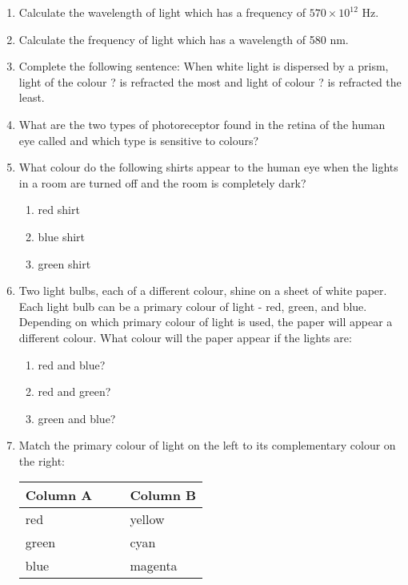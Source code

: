 \begin{eocexercises}{}
\begin{enumerate}

\item{Calculate the wavelength of light which has a frequency of $570 \times 10^{12}$ Hz.}

\item{Calculate the frequency of light which has a wavelength of 580 nm.}

\item{Complete the following sentence: When white light is dispersed by a prism, light of the colour ? is refracted the most and light of colour ? is refracted the least.}

\item{What are the two types of photoreceptor found in the retina of the human eye called and which type is sensitive to colours?}

\item{What colour do the following shirts appear to the human eye when the lights in a room are turned off and the room is completely dark?
\begin{enumerate}
\item{red shirt}
\item{blue shirt}
\item{green shirt}
\end{enumerate}}
\item{Two light bulbs, each of a different colour, shine on a sheet of white paper. Each light bulb can be a primary colour of light - red, green, and blue. Depending on which primary colour of light is used, the paper will appear a different colour. What colour will the paper appear if the lights are:
\begin{enumerate}
\item{red and blue?}
\item{red and green?}
\item{green and blue?}
\end{enumerate}}

\item{
Match the primary colour of light on the left to its complementary colour on the right:
\begin{center}
\begin{tabular}{ll}
\textbf{Column A} & \textbf{Column B} \\ \hline
red   \ \ \ & yellow \\
green \ \ \ \ \ \ \ \ \ & cyan \\
blue  \ \ \ & magenta \\
\end{tabular}
\end{center}
} 


\end{enumerate}
\end{eocexercises}
